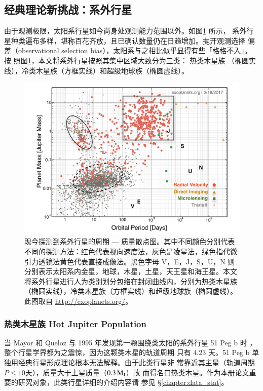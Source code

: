\subsection{经典理论新挑战：系外行星} \label{sec: exopftheory}

由于观测极限，太阳系行星如今尚身处观测能力范围以外。如图\ref{fig:exomassper} 所示，
系外行星种类遍布多样，堪称百花齐放，且已确认数量仍在日趋增加。抛开观测选择
偏差（observational selection bias），太阳系与之相比似乎显得有些「格格不入」。 按
照图\ref{fig:exomassper}，本文将系外行星按照其集中区域大致分为三类： 热类木星族
（椭圆实线），冷类木星族（方框实线）和超级地球族（椭圆虚线）。

\begin{figure}[h]
\centering
\includegraphics[width=1.0\textwidth]{figures/chapter1/fig12_nasaexompplot.pdf}
\caption{现今探测到系外行星的周期 --- 质量散点图。其中不同颜色分别代表不同的探测方法：红色代表视向速度法，灰色是凌星法，绿色指代微引力透镜法黄色代表直接成像法。黑色字母 V，E，J，S，U，N 则分别表示太阳系内金星，地球，木星，土星，天王星和海王星。本文将系外行星进行人为类别划分包络在封闭曲线内，分别为热类木星族（椭圆实线），冷类木星族（方框实线）和超级地球族（椭圆虚线）。此图取自 \url{http://exoplanets.org/}。}
\label{fig:exomassper}
\end{figure}

\subsubsection{热类木星族 Hot Jupiter Population}

当 Mayor 和 Queloz 与 1995 年发现第一颗围绕类太阳的系外行星 51 Peg b 时
\cite{MayorQueloz1995}，整个行星学界都为之震惊，因为这颗类木星的轨道周期
只有 4.23 天。51 Peg b 单独用经典行星形成理论根本无法解释。由于此类行星非
常靠近其主星（轨道周期 $P \le10 $天），质量大于土星质量（$0.3\,\mathrm{M}_\mathrm{J}$）故
而得名曰热类木星。作为本册论文重要的研究对象，此类行星详细的介绍内容请
参见 \S \ref{chapter:data_stat}。


